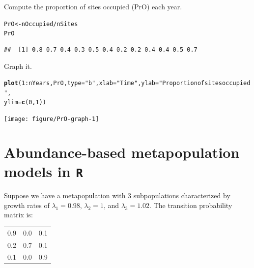 \documentclass[12pt]{article}\usepackage[]{graphicx}\usepackage[]{xcolor}
\makeatletter
\newcommand{\hlnum}[1]{\textcolor[rgb]{0.686,0.059,0.569}{#1}}%
\newcommand{\hlstr}[1]{\textcolor[rgb]{0.192,0.494,0.8}{#1}}%
\newcommand{\hlopt}[1]{\textcolor[rgb]{0,0,0}{#1}}%
\newcommand{\hlstd}[1]{\textcolor[rgb]{0.345,0.345,0.345}{#1}}%
\newcommand{\hlkwb}[1]{\textcolor[rgb]{0.69,0.353,0.396}{#1}}%
\newcommand{\hlkwc}[1]{\textcolor[rgb]{0.333,0.667,0.333}{#1}}%
\newcommand{\hlkwd}[1]{\textcolor[rgb]{0.737,0.353,0.396}{\textbf{#1}}}%
\newenvironment{kframe}{%
 \def\at@end@of@kframe{}%
 \ifinner\ifhmode%
  \def\at@end@of@kframe{\end{minipage}}%
  \begin{minipage}{\columnwidth}%
 \fi\fi%
 \def\FrameCommand##1{\hskip\@totalleftmargin \hskip-\fboxsep
 \colorbox{shadecolor}{##1}\hskip-\fboxsep
     \hskip-\linewidth \hskip-\@totalleftmargin \hskip\columnwidth}%
 \MakeFramed {\advance\hsize-\width
   \@totalleftmargin\z@ \linewidth\hsize
   \@setminipage}}%
 {\par\unskip\endMakeFramed%
 \at@end@of@kframe}
\newenvironment{knitrout}{}{} %
\makeatother
\begin{document}
\clearpage

Compute the proportion of sites occupied (PrO) each year.
\begin{knitrout}
\color{fgcolor}\begin{kframe}
\begin{alltt}
\hlstd{PrO} \hlkwb{<-} \hlstd{nOccupied} \hlopt{/} \hlstd{nSites}
\hlstd{PrO}
\end{alltt}
\begin{verbatim}
##  [1] 0.8 0.7 0.4 0.3 0.5 0.4 0.2 0.2 0.4 0.4 0.5 0.7
\end{verbatim}
\end{kframe}
\end{knitrout}

Graph it.
\begin{knitrout}
\color{fgcolor}\begin{kframe}
\begin{alltt}
\hlkwd{plot}\hlstd{(}\hlnum{1}\hlopt{:}\hlstd{nYears, PrO,} \hlkwc{type}\hlstd{=}\hlstr{"b"}\hlstd{,} \hlkwc{xlab}\hlstd{=}\hlstr{"Time"}\hlstd{,} \hlkwc{ylab}\hlstd{=}\hlstr{"Proportion of sites occupied"}\hlstd{,}
     \hlkwc{ylim}\hlstd{=}\hlkwd{c}\hlstd{(}\hlnum{0}\hlstd{,} \hlnum{1}\hlstd{))}
\end{alltt}
\end{kframe}
\texttt{[image: figure/PrO-graph-1]} 
\end{knitrout}


\clearpage

\section*{Abundance-based metapopulation models in \texttt{R}}

Suppose we have a metapopulation with 3 subpopulations characterized
by growth rates of $\lambda_1=0.98$, $\lambda_2=1$, and
$\lambda_3=1.02$. The transition probability matrix is:

\begin{table}[h!]
  \centering
  \begin{tabular}{ccc}
    \hline
    0.9 & 0.0 & 0.1 \\
    0.2 & 0.7 & 0.1 \\
    0.1 & 0.0 & 0.9 \\
    \hline
  \end{tabular}
\end{table}
\end{document}
